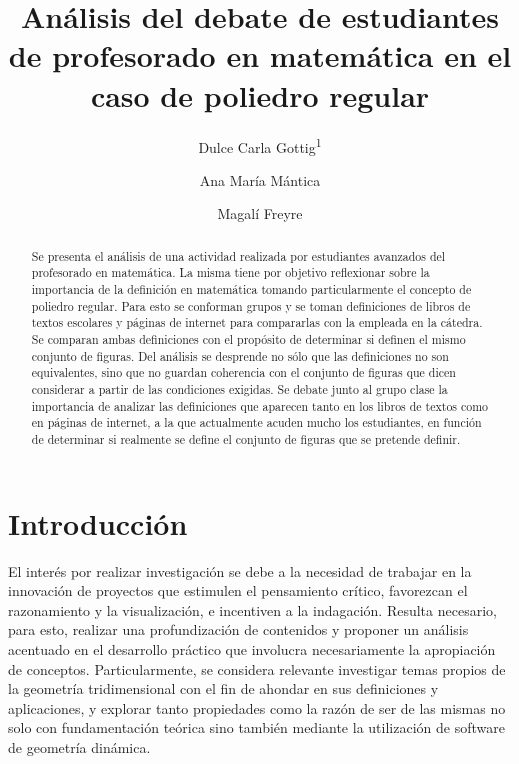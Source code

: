 \documentclass[oneside,spanish]{amsart}
\numberwithin{equation}{section}
\theoremstyle{definition}
\begin{document}
	
\title[Análisis del debate de estudiantes de profesorado en matemática en el caso de poliedro regular]{Análisis del debate de estudiantes de profesorado en matemática en el caso de poliedro regular\vspace{-2ex}}
\author[1]{Dulce Carla Gottig\textsuperscript{1}}
\author[2]{Ana María Mántica}
\author[3]{Magalí Freyre}

\begin{abstract}
	Se presenta el análisis de una actividad realizada por estudiantes avanzados del profesorado en matemática. La misma tiene por objetivo reflexionar sobre la importancia de la definición en matemática tomando particularmente el concepto de poliedro regular. Para esto se conforman grupos y se toman definiciones de libros de textos escolares y páginas de internet para compararlas con la empleada en la cátedra. Se comparan ambas definiciones con el propósito de determinar si definen el mismo conjunto de figuras. Del análisis se desprende no sólo que las definiciones no son equivalentes, sino que no guardan coherencia con el conjunto de figuras que dicen considerar a partir de las condiciones exigidas. Se debate junto al grupo clase la importancia de analizar las definiciones que aparecen tanto en los libros de textos como en páginas de internet, a la que actualmente acuden mucho los estudiantes, en función de determinar si realmente se define el conjunto de figuras que se pretende definir.
\end{abstract}

\maketitle
\thispagestyle{empty}

\section{Introducción}

El interés por realizar investigación se debe a la necesidad de trabajar en la innovación de proyectos que estimulen el pensamiento crítico, favorezcan el razonamiento y la visualización, e incentiven a la indagación. Resulta necesario, para esto, realizar una profundización de contenidos y proponer un análisis acentuado en el desarrollo práctico que involucra necesariamente la apropiación de conceptos. Particularmente, se considera relevante investigar temas propios de la geometría tridimensional con el fin de ahondar en sus definiciones y aplicaciones, y explorar tanto propiedades como la razón de ser de las mismas no solo con fundamentación teórica sino también mediante la utilización de software de geometría dinámica. 
 
\end{document}

